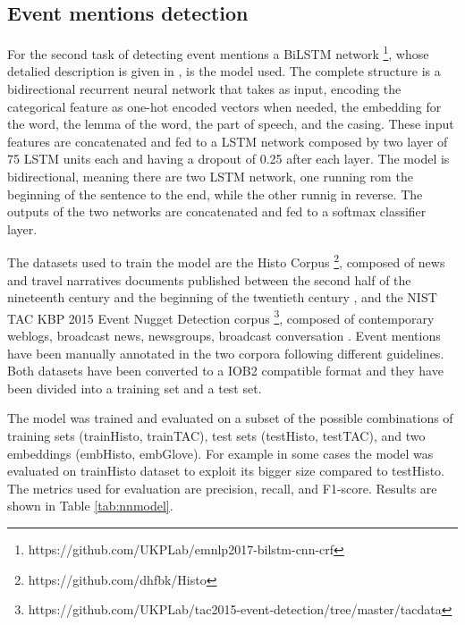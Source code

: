 \documentclass[runningheads]{llncs}
\begin{document}
\subsection{Event mentions detection}


For the second task of detecting event mentions a BiLSTM network \footnote{https://github.com/UKPLab/emnlp2017-bilstm-cnn-crf}, whose detalied description is given in \cite{bilstm}, is the model used. The complete structure is a bidirectional recurrent neural network that takes as input, encoding the categorical feature as one-hot encoded vectors when needed, the embedding for the word, the lemma of the word, the part of speech, and the casing. These input features are concatenated and fed to a LSTM network composed by two layer of 75 LSTM units each and having a dropout of 0.25 after each layer. The model is bidirectional, meaning there are two LSTM network, one running rom the beginning of the sentence to the end, while the other runnig in reverse. The outputs of the two networks are concatenated and fed to a softmax classifier layer.

The datasets used to train the model are the Histo Corpus \footnote{https://github.com/dhfbk/Histo}, composed of news and travel narratives documents published between the second half of the nineteenth century and the beginning of the twentieth century \cite{histo}, and the NIST TAC KBP 2015 Event Nugget Detection corpus \footnote{https://github.com/UKPLab/tac2015-event-detection/tree/master/tacdata}, composed of contemporary weblogs, broadcast news, newsgroups, broadcast conversation \cite{tac}. Event mentions have been manually annotated in the two corpora following different guidelines. Both datasets have been converted to a IOB2 compatible format and they have been divided into a training set and a test set.

The model was trained and evaluated on a subset of the possible combinations of training sets (trainHisto, trainTAC), test sets (testHisto, testTAC), and two embeddings (embHisto, embGlove). For example in some cases the model was evaluated on trainHisto dataset to exploit its bigger size compared to testHisto. The metrics used for evaluation are precision, recall, and F1-score. Results are shown in Table \ref{tab:nnmodel}. 
\end{document}
